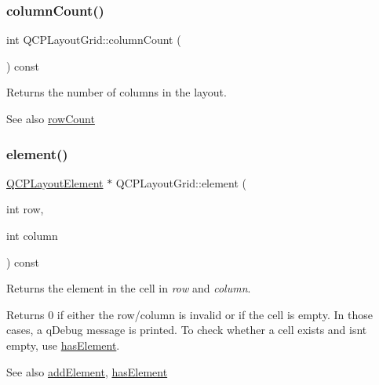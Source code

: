 \subsubsection{\texorpdfstring{column\+Count()}{columnCount()}}
{\footnotesize\ttfamily int Q\+C\+P\+Layout\+Grid\+::column\+Count (\begin{DoxyParamCaption}{ }\end{DoxyParamCaption}) const}

Returns the number of columns in the layout.

\begin{DoxySeeAlso}{See also}
\hyperlink{class_q_c_p_layout_grid_a19c66fd76cbce58a8e94f33797e0c0aa}{row\+Count} 
\end{DoxySeeAlso}
\hypertarget{class_q_c_p_layout_grid_a602b426609b4411cf6a93c3ddf3a381a}{}\label{class_q_c_p_layout_grid_a602b426609b4411cf6a93c3ddf3a381a} 
\subsubsection{\texorpdfstring{element()}{element()}}
{\footnotesize\ttfamily \hyperlink{class_q_c_p_layout_element}{Q\+C\+P\+Layout\+Element} $\ast$ Q\+C\+P\+Layout\+Grid\+::element (\begin{DoxyParamCaption}\item[{int}]{row,  }\item[{int}]{column }\end{DoxyParamCaption}) const}

Returns the element in the cell in {\itshape row} and {\itshape column}.

Returns 0 if either the row/column is invalid or if the cell is empty. In those cases, a q\+Debug message is printed. To check whether a cell exists and isn\textquotesingle{}t empty, use \hyperlink{class_q_c_p_layout_grid_ab0cf4f7edc9414a3bfaddac0f46dc0a0}{has\+Element}.

\begin{DoxySeeAlso}{See also}
\hyperlink{class_q_c_p_layout_grid_adff1a2ca691ed83d2d24a4cd1fe17012}{add\+Element}, \hyperlink{class_q_c_p_layout_grid_ab0cf4f7edc9414a3bfaddac0f46dc0a0}{has\+Element} 
\end{DoxySeeAlso}
\hypertarget{class_q_c_p_layout_grid_a97672ecc379cb3a09639926ba9980297}{}\label{class_q_c_p_layout_grid_a97672ecc379cb3a09639926ba9980297} 
